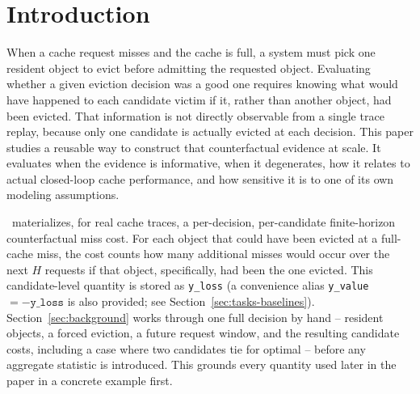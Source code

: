 \section{Introduction}
\label{sec:introduction}

\begin{sloppypar}
When a cache request misses and the cache is full, a system must pick one
resident object to evict before admitting the requested object. Evaluating
whether a given eviction decision was a good one requires knowing what
would have happened to each candidate victim if it, rather than another
object, had been evicted. That information is not directly observable
from a single trace replay, because only one candidate is actually evicted
at each decision. This paper studies a reusable way to construct that
counterfactual evidence at scale. It evaluates when the evidence is
informative, when it degenerates, how it relates to actual closed-loop
cache performance, and how sensitive it is to one of its own modeling
assumptions.
\end{sloppypar}

\lafc\ materializes, for real cache traces, a per-decision, per-candidate
finite-horizon counterfactual miss cost. For each object that could have
been evicted at a full-cache miss, the cost counts how many additional
misses would occur over the next $H$ requests if that object,
specifically, had been the one evicted. This candidate-level quantity is
stored as \texttt{y\_loss} (a
convenience alias \texttt{y\_value} $= -\texttt{y\_loss}$ is also provided;
see Section~\ref{sec:tasks-baselines}). Section~\ref{sec:background} works
through one full decision by hand -- resident objects, a forced eviction, a
future request window, and the resulting candidate costs, including a case
where two candidates tie for optimal -- before any aggregate statistic is
introduced. This grounds every quantity used later in the paper in a
concrete example first.

